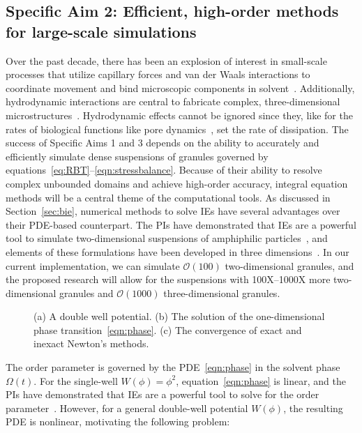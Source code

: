 \subsection{Specific Aim 2: Efficient, high-order methods for
large-scale simulations}
\label{sec:specificaim2}
Over the past decade, there has been an explosion of interest in
small-scale processes that utilize capillary forces and van der Waals
interactions to coordinate movement and bind microscopic components in
solvent~\cite{Pandey2011, Zhang2017, Siontorou2017}. Additionally,
hydrodynamic interactions are central to fabricate complex,
three-dimensional microstructures~\cite{Dasgupta2017, Leong2007,
Reynolds2019, Cho2010}. Hydrodynamic effects cannot be ignored since
they, like for the rates of biological functions like pore
dynamics~\cite{RYHAM20112929}, set the rate of dissipation. The success
of Specific Aims 1 and 3 depends on the ability to accurately and
efficiently simulate dense suspensions of granules governed by
equations~\eqref{eq:RBT}--\eqref{eqn:stressbalance}. Because of their
ability to resolve complex unbounded domains and achieve high-order
accuracy, integral equation methods will be a central theme of the
computational tools. As discussed in Section~\ref{sec:bie}, numerical
methods to solve IEs have several advantages over their PDE-based
counterpart. The PIs have demonstrated that IEs are a powerful tool to
simulate two-dimensional suspensions of amphiphilic
particles~\cite{Fu2018_SIAM, FuQuRyYo22, fu-ryh-qua-you2022}, and
elements of these formulations have been developed in three
dimensions~\cite{ying_2006, manasthesis, rac-gre2016}. In our current
implementation, we can simulate $\mathcal{O}(100)$ two-dimensional
granules, and the proposed research will allow for the suspensions with
100X--1000X more two-dimensional granules and $\mathcal{O}(1000)$
three-dimensional granules. 

\begin{wrapfigure}[27]{l}{1.8in}
  \vspace{-8pt}
  \centering
   
  \caption{\label{fig:CA} \footnotesize (a) A double well potential. (b)
  The solution of the one-dimensional phase
  transition~\eqref{eqn:phase}. (c) The convergence of exact and inexact
  Newton's methods.}
\end{wrapfigure}

The order parameter is governed by the PDE~\eqref{eqn:phase} in the
solvent phase $\Omega(t)$. For the single-well $W(\phi) = \phi^2$,
equation~\eqref{eqn:phase} is linear, and the PIs have demonstrated that
IEs are a powerful tool to solve for the order
parameter~\cite{Fu2018_SIAM, FuQuRyYo22, fu-ryh-qua-you2022}. However,
for a general double-well potential $W(\phi)$, the resulting PDE is
nonlinear, motivating the following problem:

